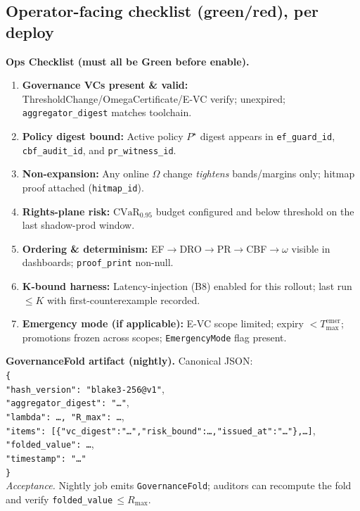 \documentclass[10pt]{article}
\begin{document}
\subsection*{Operator-facing checklist (green/red), per deploy}
\begin{ledgerbox}
\textbf{Ops Checklist (must all be \textsf{Green} before enable).}
\begin{enumerate}[leftmargin=*]
  \item \textbf{Governance VCs present \& valid:} ThresholdChange/OmegaCertificate/E-VC verify; unexpired; \texttt{aggregator\_digest} matches toolchain.
  \item \textbf{Policy digest bound:} Active policy $P^\star$ digest appears in \texttt{ef\_guard\_id}, \texttt{cbf\_audit\_id}, and \texttt{pr\_witness\_id}.
  \item \textbf{Non-expansion:} Any online $\Omega$ change \emph{tightens} bands/margins only; hitmap proof attached (\texttt{hitmap\_id}).
  \item \textbf{Rights-plane risk:} $\mathrm{CVaR}_{0.95}$ budget configured and below threshold on the last shadow-prod window.
  \item \textbf{Ordering \& determinism:} EF$\rightarrow$DRO$\rightarrow$PR$\rightarrow$CBF$\rightarrow\omega$ visible in dashboards; \texttt{proof\_print} non-null.
  \item \textbf{K-bound harness:} Latency-injection (B8) enabled for this rollout; last run $\le K$ with first-counterexample recorded.
  \item \textbf{Emergency mode (if applicable):} E-VC scope limited; expiry $<T_{\mathrm{max}}^{\mathrm{emer}}$; promotions frozen across scopes; \texttt{EmergencyMode} flag present.
\end{enumerate}
\end{ledgerbox}

\begin{ledgerbox}
\textbf{GovernanceFold artifact (nightly).}
Canonical JSON:\\
\texttt{\{} \\
\quad \texttt{"hash\_version": "blake3-256@v1"},\\
\quad \texttt{"aggregator\_digest": "…"},\\
\quad \texttt{"lambda": …, "R\_max": …},\\
\quad \texttt{"items": [\{"vc\_digest":"…","risk\_bound":…,"issued\_at":"…"\},…]},\\
\quad \texttt{"folded\_value": …},\\
\quad \texttt{"timestamp": "…"}\\
\texttt{\}}\\
\emph{Acceptance.} Nightly job emits \texttt{GovernanceFold}; auditors can recompute the fold and verify \texttt{folded\_value}\,$\le R_{\max}$.
\end{ledgerbox}
\end{document}
